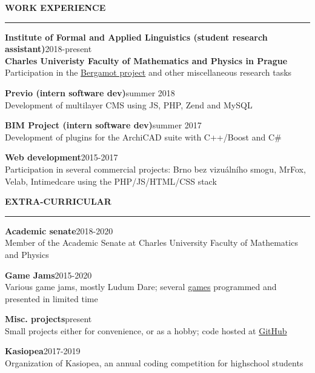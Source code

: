\documentclass[11pt,a4paper]{article} %
\newcommand{\hSection}[1]{
    \medskip
    \MakeUppercase{\bf #1}
    \medskip
    \hrule
}
\newcommand{\hSubsection}[2]{{\bf #1}\hfill {#2}}
\begin{document}
\vspace{-0.5cm}
\hSection{Work Experience}
\hSubsection{Institute of Formal and Applied Linguistics (student research assistant)}{2018-present} \\
\textbf{Charles Univeristy Faculty of Mathematics and Physics in Prague}\\
Participation in the \href{https://browser.mt/}{Bergamot project} and other miscellaneous research tasks

\hSubsection{Previo (intern software dev)}{summer 2018} \\
Development of multilayer CMS using JS, PHP, Zend and MySQL

\hSubsection{BIM Project (intern software dev)}{summer 2017} \\
Development of plugins for the ArchiCAD suite with C++/Boost and C\#

\hSubsection{Web development}{2015-2017} \\
Participation in several commercial projects: Brno bez vizuálního smogu, MrFox,\\Velab, Intimedcare using the PHP/JS/HTML/CSS stack

\hSection{Extra-Curricular}
\hSubsection{Academic senate}{2018-2020} \\
Member of the Academic Senate at Charles University Faculty of Mathematics and Physics

\hSubsection{Game Jams}{2015-2020} \\
Various game jams, mostly Ludum Dare; several \href{https://github.com/allemansratten}{games} programmed and presented in limited time

\hSubsection{Misc. projects}{present} \\
Small projects either for convenience, or as a hobby; code hosted at \href{https://github.com/zouharvi}{GitHub}

\hSubsection{Kasiopea}{2017-2019} \\
Organization of Kasiopea, an annual coding competition for highschool students
\end{document}
